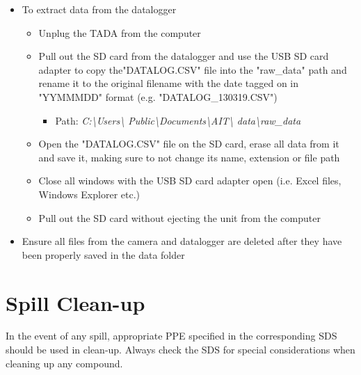 \documentclass[letterpaper,11pt]{article}
\begin{document}
\begin{itemize}
    \item To extract data from the datalogger
        \begin{itemize}
        \item Unplug the TADA from the computer
        \item Pull out the SD card from the datalogger and use the USB SD card 
            adapter to copy the"DATALOG.CSV" file into the "raw\_data" path and 
            rename it to the original filename with the date 
            tagged on in "YYMMMDD" format (e.g. "DATALOG\_130319.CSV")
            \begin{itemize}
            \item Path: \textit{C:\textbackslash Users\textbackslash 
            Public\textbackslash Documents\textbackslash AIT\textbackslash 
            data\textbackslash raw\_data}
            \end{itemize}
        \item Open the "DATALOG.CSV" file on the SD card, erase all data from
            it and save it, making sure to not change its name, extension or 
            file path
        \item Close all windows with the USB SD card adapter open (i.e. Excel 
            files, Windows Explorer etc.)
        \item Pull out the SD card without ejecting the unit from the computer
        \end{itemize}
    
    \item Ensure all files from the camera and datalogger are deleted after they
        have been properly saved in the data folder 
            
    \end{itemize}


\section{Spill Clean-up}
In the event of any spill, appropriate PPE specified in the corresponding SDS 
    should be used in clean-up. Always check the SDS for special considerations
    when cleaning up any compound.
\end{document}

